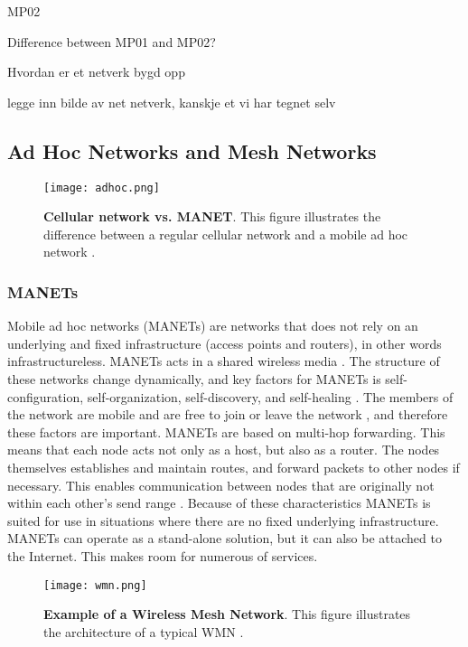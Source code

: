 MP02

Difference between MP01 and MP02?

Hvordan er et netverk bygd opp

legge inn bilde av net netverk, kanskje et vi har tegnet selv

\subsection{Ad Hoc Networks and Mesh Networks}

\begin{figure}[h!]
  \centering
    \texttt{[image: adhoc.png]}
     \caption [Cellular network vs. MANET]{\textbf{Cellular network vs. MANET}. This figure illustrates the difference between a regular cellular network and a mobile ad hoc network \cite{adhoc2}.}
\label{fig:adhoc}
\end{figure}

\subsubsection{MANETs} Mobile ad hoc networks (MANETs) are networks that does not rely on an underlying and fixed infrastructure (access points and routers), in other words infrastructureless. MANETs acts in a shared wireless media \cite{adhoc}. The structure of these networks change dynamically, and key factors for MANETs is self-configuration, self-organization, self-discovery, and self-healing \cite{wmn}. The members of the network are mobile and are free to join or leave the network \cite{adhoc2}, and therefore these factors are important. MANETs are based on multi-hop forwarding. This means that each node acts not only as a host, but also as a router. The nodes themselves establishes and maintain routes, and forward packets to other nodes if necessary. This enables communication between nodes that are originally not within each other's send range \cite{adhoc2}. Because of these characteristics MANETs is suited for use in situations where there are no fixed underlying infrastructure. MANETs can operate as a stand-alone solution, but it can also be attached to the Internet. This makes room for numerous of services. 

\begin{figure}[h!]
  \centering
    \texttt{[image: wmn.png]}
     \caption [Example of a Wireless Mesh Network]{\textbf{Example of a Wireless Mesh Network}. This figure illustrates the architecture of a typical WMN \cite{wmn}.}
\label{fig:wmn}
\end{figure}

